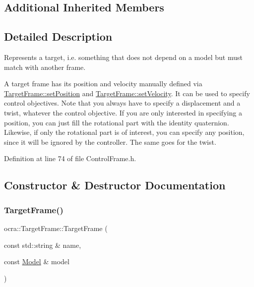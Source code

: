 \subsection*{Additional Inherited Members}


\subsection{Detailed Description}
Represents a \textquotesingle{}target\textquotesingle{}, i.\+e. something that does not depend on a model but must match with another frame. 

A target frame has its position and velocity manually defined via \hyperlink{classocra_1_1TargetFrame_a760081f3ae88a43ff91dc6a746083286}{Target\+Frame\+::set\+Position} and \hyperlink{classocra_1_1TargetFrame_aff778ddb4526e90b927ec12bda52e8d6}{Target\+Frame\+::set\+Velocity}. It can be used to specify control objectives. Note that you always have to specify a displacement and a twist, whatever the control objective. If you are only interested in specifying a position, you can just fill the rotational part with the identity quaternion. Likewise, if only the rotational part is of interest, you can specify any position, since it will be ignored by the controller. The same goes for the twist. 

Definition at line 74 of file Control\+Frame.\+h.



\subsection{Constructor \& Destructor Documentation}
\hypertarget{classocra_1_1TargetFrame_ab7cf677c24a55434c4b285127235ae3c}{}\label{classocra_1_1TargetFrame_ab7cf677c24a55434c4b285127235ae3c} 
\subsubsection{\texorpdfstring{Target\+Frame()}{TargetFrame()}}
{\footnotesize\ttfamily ocra\+::\+Target\+Frame\+::\+Target\+Frame (\begin{DoxyParamCaption}\item[{const std\+::string \&}]{name,  }\item[{const \hyperlink{classocra_1_1Model}{Model} \&}]{model }\end{DoxyParamCaption})}




